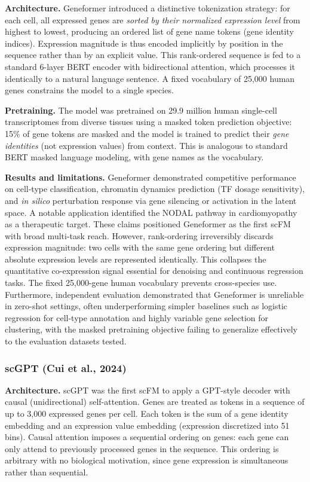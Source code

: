 \textbf{Architecture.} Geneformer \cite{theodorisTransferLearningEnables2023} introduced a
distinctive tokenization strategy: for each cell, all expressed genes are \emph{sorted by their
normalized expression level} from highest to lowest, producing an ordered list of gene name tokens
(gene identity indices). Expression magnitude is thus encoded implicitly by position in the
sequence rather than by an explicit value. This rank-ordered sequence is fed to a standard
6-layer \gls{BERT} encoder with bidirectional attention, which processes it identically to a
natural language sentence. A fixed vocabulary of 25,000 human genes constrains the model to a
single species.

\textbf{Pretraining.} The model was pretrained on 29.9 million human single-cell transcriptomes
from diverse tissues using a masked token prediction objective: 15\% of gene tokens are masked and
the model is trained to predict their \emph{gene identities} (not expression values) from context.
This is analogous to standard \gls{BERT} masked language modeling, with gene names as the
vocabulary.

\textbf{Results and limitations.} Geneformer demonstrated competitive performance on cell-type
classification, chromatin dynamics prediction (\gls{TF} dosage sensitivity), and \textit{in
silico} perturbation response via gene silencing or activation in the latent space. A notable
application identified the NODAL pathway in cardiomyopathy as a therapeutic target. These claims
positioned Geneformer as the first \gls{scFM} with broad multi-task reach. However, rank-ordering irreversibly discards expression magnitude: two cells with
the same gene ordering but different absolute expression levels are represented identically. This
collapses the quantitative co-expression signal essential for denoising and continuous regression
tasks. The fixed 25,000-gene human vocabulary prevents cross-species use. Furthermore, independent
evaluation \cite{boiarskyDeepDiveSingleCell2023} demonstrated that Geneformer is unreliable in
zero-shot settings, often underperforming simpler baselines such as logistic regression for
cell-type annotation and highly variable gene selection for clustering, with the masked pretraining
objective failing to generalize effectively to the evaluation datasets tested.

\subsubsection{scGPT (Cui et al., 2024)}
\textbf{Architecture.} scGPT \cite{cuiScGPTBuildingFoundation2024} was the first \gls{scFM} to
apply a \gls{GPT}-style decoder with causal (unidirectional) self-attention. Genes are treated as
tokens in a sequence of up to 3,000 expressed genes per cell. Each token is the sum of a gene
identity embedding and an expression value embedding (expression discretized into 51 bins). Causal
attention imposes a sequential ordering on genes: each gene can only attend to previously processed
genes in the sequence. This ordering is arbitrary with no biological motivation, since gene
expression is simultaneous rather than sequential.


